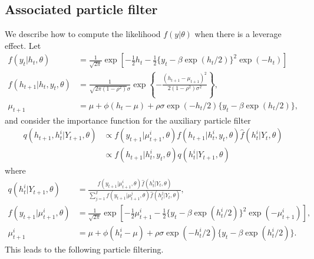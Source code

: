 \subsection{Associated particle filter}
We describe how to compute the likelihood $f(y|\theta)$ when there is a leverage effect. Let
\begin{align*}
    f(y_t|h_t, \theta) &= \frac{1}{\sqrt{2\pi}} \exp \left[ -\frac{1}{2}h_t - \frac{1}{2} \{ y_t - \beta \exp(h_t/2) \}^2 \exp(-h_t) \right] \\
    f(h_{t+1}|h_t, y_t, \theta) &= \frac{1}{\sqrt{2\pi (1-\rho^2)} \sigma} \exp \left\{ -\frac{(h_{t+1} - \mu_{t+1})^2}{2(1-\rho^2) \sigma^2} \right\}, \\
    \mu_{t+1} &= \mu + \phi(h_t-\mu) + \rho \sigma \exp(-h_t/2) \{ y_t - \beta \exp(h_t/2) \},
\end{align*}
and consider the importance function for the auxiliary particle filter
\begin{align*}
    q(h_{t+1}, h_t^i| Y_{t+1}, \theta) &\propto  f(y_{t+1}| \mu_{t+1}^i, \theta) f(h_{t+1}|h_t^i, y_t, \theta) \hat{f}(h_t^i|Y_t, \theta) \\
    &\propto f(h_{t+1}|h_t^i, y_t, \theta) q(h_t^i| Y_{t+1}, \theta)
\end{align*}
where
\begin{align*}
    q(h_t^i| Y_{t+1}, \theta) &= \frac{f(y_{t+1}| \mu_{t+1}^i, \theta) \hat{f}(h_t^i|Y_t, \theta)}{\sum_{j=1}^I f(y_{t+1}| \mu_{t+1}^j, \theta) \hat{f}(h_t^j|Y_t, \theta)}, \\
    f(y_{t+1}|\mu_{t+1}^i, \theta) &= \frac{1}{\sqrt{2\pi}} \exp \left[ -\frac{1}{2}\mu_{t+1}^i - \frac{1}{2} \{ y_t - \beta \exp(h_t^i/2) \}^2 \exp(-\mu_{t+1}^i) \right], \\
    \mu_{t+1}^i &= \mu + \phi(h_t^i-\mu) + \rho \sigma \exp(-h_t^i/2) \{ y_t - \beta \exp(h_t^i/2) \}.    
\end{align*}
This leads to the following particle filtering.
